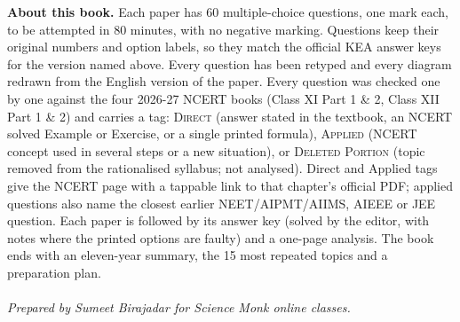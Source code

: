 \vfill
\begin{center}
\begin{minipage}{0.78\textwidth}\centering\small
\textbf{\color{navy}About this book.} Each paper has 60 multiple-choice questions, one mark each, to be attempted in 80 minutes, with no negative marking. Questions keep their original numbers and option labels, so they match the official KEA answer keys for the version named above. Every question has been retyped and every diagram redrawn from the English version of the paper. Every question was checked one by one against the four 2026-27 NCERT books (Class XI Part 1 \& 2, Class XII Part 1 \& 2) and carries a tag: \textsc{Direct} (answer stated in the textbook, an NCERT solved Example or Exercise, or a single printed formula), \textsc{Applied} (NCERT concept used in several steps or a new situation), or \textsc{Deleted Portion} (topic removed from the rationalised syllabus; not analysed). Direct and Applied tags give the NCERT page with a tappable link to that chapter's official PDF; applied questions also name the closest earlier NEET/AIPMT/AIIMS, AIEEE or JEE question. Each paper is followed by its answer key (solved by the editor, with notes where the printed options are faulty) and a one-page analysis. The book ends with an eleven-year summary, the 15 most repeated topics and a preparation plan.\\[8pt]
{\color{gilt}}\\[4pt]
{\itshape Prepared by Sumeet Birajadar for Science Monk online classes.}
\end{minipage}
\end{center}
\clearpage
